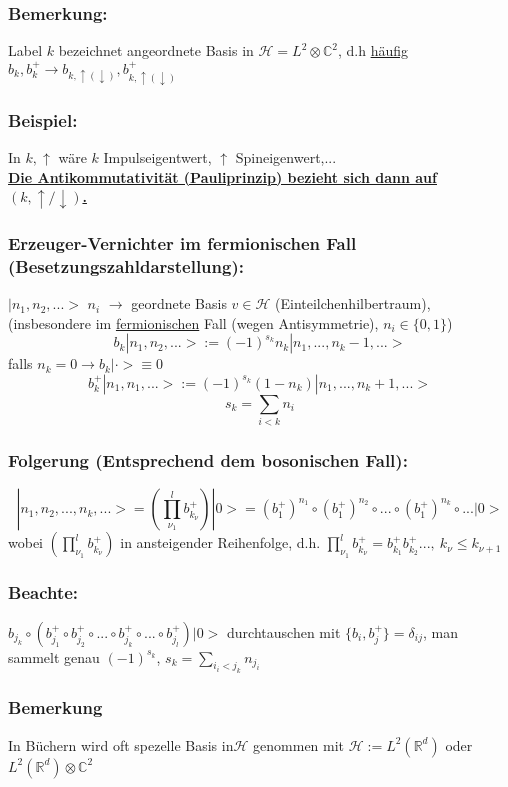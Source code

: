 \documentclass[twoside,a4paper]{scrartcl}
\newcommand{\R}{\mathbb{R}}
\newcommand{\C}{\mathbb{C}}
\renewcommand{\1}{\mathds{1}}
\newcommand{\ra}{\rightarrow}
\renewcommand{\H}{\mathcal{H}}
\renewcommand{\R}{\mathbb{R}}
\renewcommand{\C}{\mathbb{C}}
\begin{document}
\subsubsection*{Bemerkung:}
Label $k$ bezeichnet angeordnete Basis in $\H=L^2 \otimes \C^2$, d.h \underline{häufig} $b_k,b_k^+ \ra b_{k,\uparrow(\downarrow)},b_{k,\uparrow(\downarrow)}^+$
\subsubsection*{Beispiel:}
In $k,\uparrow$ wäre $k$ Impulseigentwert, $\uparrow$ Spineigenwert,...\\
\underline{\textbf{Die Antikommutativität (Pauliprinzip) bezieht sich dann auf $(k,\uparrow/\downarrow)$.}}

\subsubsection*{Erzeuger-Vernichter im fermionischen Fall (Besetzungszahldarstellung):}
$|n_1,n_2,...>$ $n_i$ $\ra$ geordnete Basis $v \in \H$ (Einteilchenhilbertraum), (insbesondere im  \underline{fermionischen} Fall (wegen Antisymmetrie), $n_i\in \{0,1\}$)
$$b_k|n_1,n_2,...>:=(-1)^{s_k} n_k|n_1,...,n_k-1,...>$$
falls $n_k=0 \ra b_k|\cdot>\equiv 0$
$$b_k^+|n_1,n_1,...>:=(-1)^{s_k} (1-n_k)|n_1,...,n_k+1,...>$$
$$s_k=\sum_{i<k}n_i$$
\subsubsection*{Folgerung (Entsprechend dem bosonischen Fall):}
$$|n_1,n_2,...,n_k,...>=(\prod_{\nu_1}^l b_{k_\nu}^+)|0>=(b_1^+)^{n_1}\circ (b_1^+)^{n_2}\circ ... \circ (b_1^+)^{n_k} \circ ...|0>$$
wobei $(\prod_{\nu_1}^l b_{k_\nu}^+)$ in ansteigender Reihenfolge, d.h. $\prod_{\nu_1}^l b_{k_\nu}^+=b_{k_1}^+b_{k_2}^+..., \ k_\nu \leq k_{\nu+1}$
\subsubsection*{Beachte:}
$b_{j_k}\circ(b_{j_1}^+\circ b_{j_2}^+ \circ ... \circ b_{j_k}^+ \circ ... \circ b_{j_l}^+)|0>$ durchtauschen mit $\{b_i,b_j^+\}=\delta_{ij}$, man sammelt genau $(-1)^{s_k}$, $s_k=\sum_{i_i< j_k} n_{j_i}$
\subsubsection*{Bemerkung}
In Büchern wird oft spezelle Basis in$\H$ genommen mit $\H:=L^2(\R^d)$ oder $L^2(\R^d)\otimes \C^2$
\end{document}
